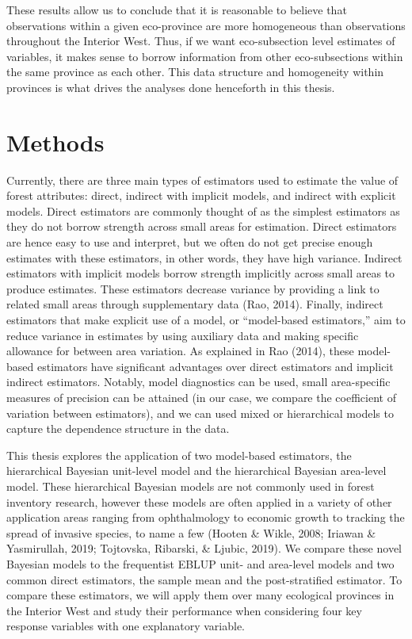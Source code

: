 \documentclass[12pt,twoside]{reedthesis}
\begin{document}
These results allow us to conclude that it is reasonable to believe that observations within a given eco-province are more homogeneous than observations throughout the Interior West. Thus, if we want eco-subsection level estimates of variables, it makes sense to borrow information from other eco-subsections within the same province as each other. This data structure and homogeneity within provinces is what drives the analyses done henceforth in this thesis.

\hypertarget{methods}{%
\chapter{Methods}\label{methods}}

Currently, there are three main types of estimators used to estimate the value of forest attributes: direct, indirect with implicit models, and indirect with explicit models. Direct estimators are commonly thought of as the simplest estimators as they do not borrow strength across small areas for estimation. Direct estimators are hence easy to use and interpret, but we often do not get precise enough estimates with these estimators, in other words, they have high variance. Indirect estimators with implicit models borrow strength implicitly across small areas to produce estimates. These estimators decrease variance by providing a link to related small areas through supplementary data (Rao, 2014). Finally, indirect estimators that make explicit use of a model, or ``model-based estimators,'' aim to reduce variance in estimates by using auxiliary data and making specific allowance for between area variation. As explained in Rao (2014), these model-based estimators have significant advantages over direct estimators and implicit indirect estimators. Notably, model diagnostics can be used, small area-specific measures of precision can be attained (in our case, we compare the coefficient of variation between estimators), and we can used mixed or hierarchical models to capture the dependence structure in the data.

This thesis explores the application of two model-based estimators, the hierarchical Bayesian unit-level model and the hierarchical Bayesian area-level model. These hierarchical Bayesian models are not commonly used in forest inventory research, however these models are often applied in a variety of other application areas ranging from ophthalmology to economic growth to tracking the spread of invasive species, to name a few (Hooten \& Wikle, 2008; Iriawan \& Yasmirullah, 2019; Tojtovska, Ribarski, \& Ljubic, 2019). We compare these novel Bayesian models to the frequentist EBLUP unit- and area-level models and two common direct estimators, the sample mean and the post-stratified estimator. To compare these estimators, we will apply them over many ecological provinces in the Interior West and study their performance when considering four key response variables with one explanatory variable.
\end{document}

